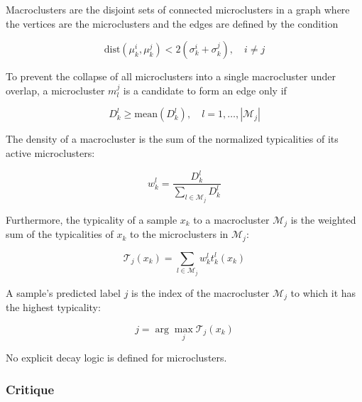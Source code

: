 \documentclass[a4paper]{article}
\begin{document}
Macroclusters are the disjoint sets of connected microclusters in a graph where the vertices are the microclusters and the edges are defined by the condition

\begin{equation}
    \text{dist}(\mu^i_k, \mu^j_k) < 2 \left( \sigma^i_k + \sigma^j_k \right), \quad i \neq j
\end{equation}

To prevent the collapse of all microclusters into a single macrocluster under overlap, a microcluster $m^j_l$ is a candidate to form an edge only if

\begin{equation}
    D^l_k \ge \text{mean}\left(D^l_k\right), \quad l = 1,\dots,\left|\mathcal{M}_j\right| \label{critique:use_of_unstable_density}
\end{equation}


The density of a macrocluster is the sum of the normalized typicalities of its active microclusters:

\begin{equation}
    w^l_k = \frac{D^l_k}{\sum_{l\in\mathcal{M}_j} D^l_k}
\end{equation}

Furthermore, the typicality of a sample $x_k$ to a macrocluster $\mathcal{M}_j$ is the weighted sum of the typicalities of $x_k$ to the microclusters in $\mathcal{M}_j$:

\begin{equation}
    \mathcal{T}_j(x_k) = \sum_{l\in\mathcal{M}_j} w^l_k t^l_k(x_k)
\end{equation}

A sample's predicted label $j$ is the index of the macrocluster $\mathcal{M}_j$ to which it has the highest typicality:

\begin{equation}
    j = \arg\max_j \mathcal{T}_j(x_k)
\end{equation}

No explicit decay logic is defined for microclusters.

\subsubsection{Critique}
\end{document}
